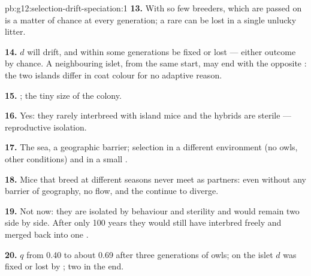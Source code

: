 \begin{solution}{pb:g12:selection-drift-speciation:1}
\textbf{13.} With so few breeders, which  are passed on is a
matter of chance at every generation; a rare  can be lost in a
single unlucky litter.

\textbf{14.} $d$ will drift, and within some generations be fixed or
lost --- either outcome by chance. A neighbouring islet, from the same
start, may end with the opposite : the two islands differ in
coat colour for no adaptive reason.

\textbf{15.} ; the tiny size of the colony.

\textbf{16.} Yes: they rarely interbreed with island mice and the
hybrids are sterile --- reproductive isolation.

\textbf{17.} The sea, a geographic barrier; selection in a different
environment (no owls, other conditions) and  in a small
.

\textbf{18.} Mice that breed at different seasons never meet as
partners: even without any barrier of geography, no  flow, and
the  continue to diverge.

\textbf{19.} Not now: they are isolated by behaviour and sterility and
would remain two  side by side. After only 100 years they would
still have interbred freely and merged back into one .

\textbf{20.} $q$ from 0.40 to about 0.69 after three generations of
owls; on the islet $d$ was fixed or lost by ; two 
in the end.
\end{solution}
